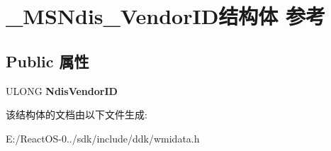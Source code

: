 \hypertarget{struct___m_s_ndis___vendor_i_d}{}\section{\+\_\+\+M\+S\+Ndis\+\_\+\+Vendor\+I\+D结构体 参考}
\label{struct___m_s_ndis___vendor_i_d}
\subsection*{Public 属性}
\begin{DoxyCompactItemize}
\item 
\mbox{\label{struct___m_s_ndis___vendor_i_d_abcd50c7e21e02d542fd93f1a2b3a78bf}} 
U\+L\+O\+NG {\bfseries Ndis\+Vendor\+ID}
\end{DoxyCompactItemize}


该结构体的文档由以下文件生成\+:\begin{DoxyCompactItemize}
\item 
E\+:/\+React\+O\+S-\/0../sdk/include/ddk/wmidata.\+h\end{DoxyCompactItemize}
